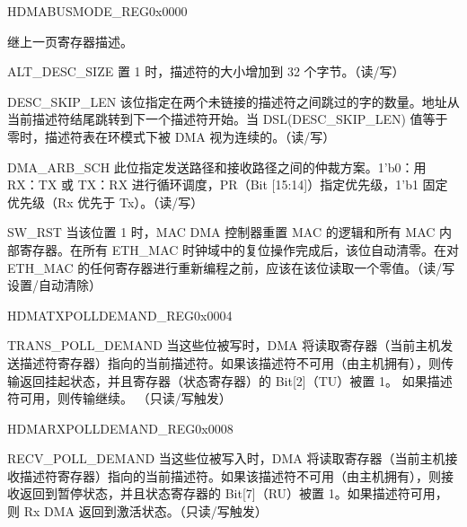 \addtocounter{Regfloat}{-1}
\begin{register}{H}{DMABUSMODE\_REG}{0x0000}
\begin{regdesc}\begin{reglist}
\item [继上一页寄存器描述。]
\item [ALT\_DESC\_SIZE]置 1 时，描述符的大小增加到 32 个字节。（读/写）
\item [DESC\_SKIP\_LEN] 该位指定在两个未链接的描述符之间跳过的字的数量。地址从当前描述符结尾跳转到下一个描述符开始。当 DSL(DESC\_SKIP\_LEN) 值等于零时，描述符表在环模式下被 DMA 视为连续的。（读/写）
\item [DMA\_ARB\_SCH] 此位指定发送路径和接收路径之间的仲裁方案。1'b0：用 RX：TX 或 TX：RX 进行循环调度，PR（Bit [15:14]）指定优先级，1'b1 固定优先级（Rx 优先于 Tx）。（读/写）
\item [SW\_RST]当该位置 1 时，MAC DMA 控制器重置 MAC 的逻辑和所有 MAC 内部寄存器。在所有 ETH\_MAC 时钟域中的复位操作完成后，该位自动清零。在对 ETH\_MAC 的任何寄存器进行重新编程之前，应该在该位读取一个零值。（读/写设置/自动清除）
\end{reglist}\end{regdesc}
\end{register}


\begin{register}{H}{DMATXPOLLDEMAND\_REG}{0x0004}\label{regdesc:DMATXPOLLDEMANDREG}
%
\regnewline%
\begin{regdesc}\begin{reglist}
\item [TRANS\_POLL\_DEMAND]当这些位被写时，DMA 将读取寄存器（当前主机发送描述符寄存器）指向的当前描述符。如果该描述符不可用（由主机拥有），则传输返回挂起状态，并且寄存器（状态寄存器）的 Bit[2]（TU）被置 1。 如果描述符可用，则传输继续。 （只读/写触发）
\end{reglist}\end{regdesc}
\end{register}


\begin{register}{H}{DMARXPOLLDEMAND\_REG}{0x0008}\label{regdesc:DMARXPOLLDEMANDREG}
%
\regnewline%
\begin{regdesc}\begin{reglist}
\item [RECV\_POLL\_DEMAND]当这些位被写入时，DMA 将读取寄存器（当前主机接收描述符寄存器）指向的当前描述符。如果该描述符不可用（由主机拥有），则接收返回到暂停状态，并且状态寄存器的 Bit[7]（RU）被置 1。如果描述符可用，则 Rx DMA 返回到激活状态。（只读/写触发）
\end{reglist}\end{regdesc}
\end{register}


